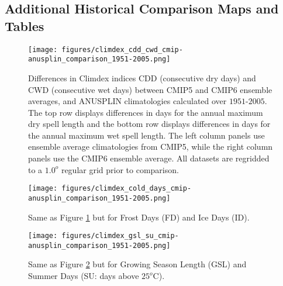 \documentclass[]{scrartcl}
\begin{document}
\begin{appendices}
\clearpage

\section{Additional Historical Comparison Maps and Tables}\label{added_hist}

\begin{figure}[ht!]
	\centering
	\texttt{[image: figures/climdex\_cdd\_cwd\_cmip-anusplin\_comparison\_1951-2005.png]}
	\caption[DD]{Differences in Climdex indices CDD (consecutive dry days) and CWD (consecutive wet days) between CMIP5 and CMIP6 ensemble averages, and ANUSPLIN climatologies calculated over $1951$-$2005$. The top row displays differences in days for the annual maximum dry spell length and the bottom row displays differences in days for the annual maximum wet spell length. The left column panels use ensemble average climatologies from CMIP5, while the right column panels use the CMIP6 ensemble average. All datasets are regridded to a $1.0^o$ regular grid prior to comparison.}
	\label{fig:ddETCCDI_hist}
\end{figure}

\begin{figure}[ht!]
	\centering
	\texttt{[image: figures/climdex\_cold\_days\_cmip-anusplin\_comparison\_1951-2005.png]}
	\caption[DD]{Same as Figure \ref{fig:ddETCCDI_hist} but for Frost Days (FD) and Ice Days (ID).}
	\label{fig:coldETCCDI_hist}
\end{figure}


\begin{figure}[ht!]
	\centering
	\texttt{[image: figures/climdex\_gsl\_su\_cmip-anusplin\_comparison\_1951-2005.png]}
	\caption[DD]{Same as Figure \ref{fig:coldETCCDI_hist} but for Growing Season Length (GSL) and Summer Days (SU: days above $25^o$C).}
	\label{fig:gslETCCDI_hist}
\end{figure}


\end{appendices}
\end{document}

